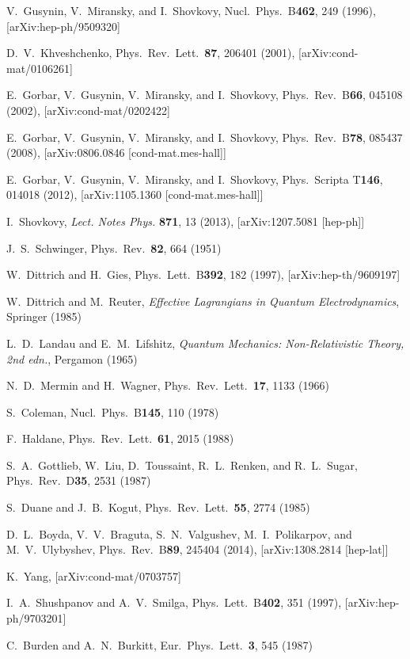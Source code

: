 \documentclass[aps,prd,twocolumn,showpacs,superscriptaddress,groupedaddress]{revtex4}  %
\begin{document}
\begin{thebibliography}{99}
V.~Gusynin, V.~Miransky, and I.~Shovkovy, Nucl.\ Phys.\ B{\bf 462}, 249 (1996), [arXiv:hep-ph/9509320]

D.~V.~Khveshchenko, Phys.\ Rev.\ Lett.\ {\bf 87}, 206401 (2001), [arXiv:cond-mat/0106261]

E.~Gorbar, V.~Gusynin, V.~Miransky, and I.~Shovkovy, Phys.\ Rev.\ B{\bf 66}, 045108 (2002), [arXiv:cond-mat/0202422]

E.~Gorbar, V.~Gusynin, V.~Miransky, and I.~Shovkovy, Phys.\ Rev.\ B{\bf 78}, 085437 (2008), [arXiv:0806.0846 [cond-mat.mes-hall]]

E.~Gorbar, V.~Gusynin, V.~Miransky, and I.~Shovkovy, Phys.\ Scripta T{\bf146}, 014018 (2012), [arXiv:1105.1360 [cond-mat.mes-hall]]

I.~Shovkovy, {\it Lect. Notes Phys.} {\bf 871}, 13 (2013), [arXiv:1207.5081 [hep-ph]]

J.~S.~Schwinger, Phys.\ Rev.\ {\bf 82}, 664 (1951)

W.~Dittrich and H.~Gies, Phys.\ Lett.\ B{\bf 392}, 182 (1997), [arXiv:hep-th/9609197]

W.~Dittrich and M.~Reuter, {\it Effective Lagrangians in Quantum Electrodynamics}, Springer (1985)

L.~D.~Landau and E.~M.~Lifshitz, {\it Quantum Mechanics: Non-Relativistic Theory, 2nd edn.}, Pergamon (1965)

N.~D.~Mermin and H.~Wagner, Phys.\ Rev.\ Lett.\ {\bf 17}, 1133 (1966)

S.~Coleman, Nucl.\ Phys.\ B{\bf 145}, 110 (1978)

F.~Haldane, Phys.\ Rev.\ Lett.\ {\bf  61}, 2015 (1988)

S.~A.~Gottlieb, W.~Liu, D.~Toussaint, R.~L.~Renken, and R.~L.~Sugar, Phys.\ Rev.\ D{\bf 35}, 2531 (1987)

S.~Duane and J.~B.~Kogut, Phys.\ Rev.\ Lett.\ {\bf 55}, 2774 (1985)

D.~L.~Boyda, V.~V.~Braguta, S.~N.~Valgushev, M.~I.~Polikarpov, and M.~V.~Ulybyshev, Phys.\ Rev.\ B{\bf 89}, 245404 (2014), [arXiv:1308.2814 [hep-lat]]

K.~Yang, [arXiv:cond-mat/0703757]

I.~A.~Shushpanov and A.~V.~Smilga, Phys.\ Lett.\ B{\bf 402}, 351 (1997), [arXiv:hep-ph/9703201]



C.~Burden and A.~N.~Burkitt, Eur.\ Phys.\ Lett.\ {\bf 3}, 545 (1987)


\end{thebibliography}
\end{document}
